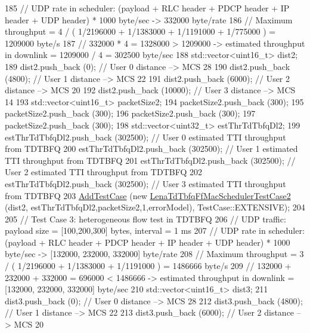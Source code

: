 \begin{DoxyCode}
185   \textcolor{comment}{//   UDP rate in scheduler: (payload + RLC header + PDCP header + IP header + UDP header) * 1000 byte/sec
       -> 332000 byte/rate}
186   \textcolor{comment}{// Maximum throughput = 4 / ( 1/2196000 + 1/1383000 + 1/1191000 + 1/775000 ) = 1209000 byte/s}
187   \textcolor{comment}{// 332000 * 4 = 1328000 > 1209000 -> estimated throughput in downlink = 1209000 / 4 = 302500 byte/sec}
188   std::vector<uint16\_t> dist2;
189   dist2.push\_back (0);       \textcolor{comment}{// User 0 distance --> MCS 28}
190   dist2.push\_back (4800);    \textcolor{comment}{// User 1 distance --> MCS 22}
191   dist2.push\_back (6000);    \textcolor{comment}{// User 2 distance --> MCS 20}
192   dist2.push\_back (10000);   \textcolor{comment}{// User 3 distance --> MCS 14}
193   std::vector<uint16\_t> packetSize2;
194   packetSize2.push\_back (300);
195   packetSize2.push\_back (300);
196   packetSize2.push\_back (300);
197   packetSize2.push\_back (300);
198   std::vector<uint32\_t> estThrTdTbfqDl2;
199   estThrTdTbfqDl2.push\_back (302500); \textcolor{comment}{// User 0 estimated TTI throughput from TDTBFQ}
200   estThrTdTbfqDl2.push\_back (302500); \textcolor{comment}{// User 1 estimated TTI throughput from TDTBFQ}
201   estThrTdTbfqDl2.push\_back (302500); \textcolor{comment}{// User 2 estimated TTI throughput from TDTBFQ}
202   estThrTdTbfqDl2.push\_back (302500); \textcolor{comment}{// User 3 estimated TTI throughput from TDTBFQ}
203   \hyperlink{classns3_1_1TestCase_a3718088e3eefd5d6454569d2e0ddd835}{AddTestCase} (\textcolor{keyword}{new} \hyperlink{classLenaTdTbfqFfMacSchedulerTestCase2}{LenaTdTbfqFfMacSchedulerTestCase2} (dist2,
      estThrTdTbfqDl2,packetSize2,1,errorModel), TestCase::EXTENSIVE);
204 
205   \textcolor{comment}{// Test Case 3: heterogeneous flow test in TDTBFQ}
206   \textcolor{comment}{//   UDP traffic: payload size = [100,200,300] bytes, interval = 1 ms}
207   \textcolor{comment}{//   UDP rate in scheduler: (payload + RLC header + PDCP header + IP header + UDP header) * 1000 byte/sec
       -> [132000, 232000, 332000] byte/rate }
208   \textcolor{comment}{// Maximum throughput = 3 / ( 1/2196000 + 1/1383000 + 1/1191000 ) = 1486666  byte/s}
209   \textcolor{comment}{// 132000 + 232000 + 332000 = 696000 < 1486666 -> estimated throughput in downlink = [132000, 232000,
       332000] byte/sec}
210   std::vector<uint16\_t> dist3;
211   dist3.push\_back (0);    \textcolor{comment}{// User 0 distance --> MCS 28}
212   dist3.push\_back (4800);    \textcolor{comment}{// User 1 distance --> MCS 22}
213   dist3.push\_back (6000);    \textcolor{comment}{// User 2 distance --> MCS 20}

\end{DoxyCode}
